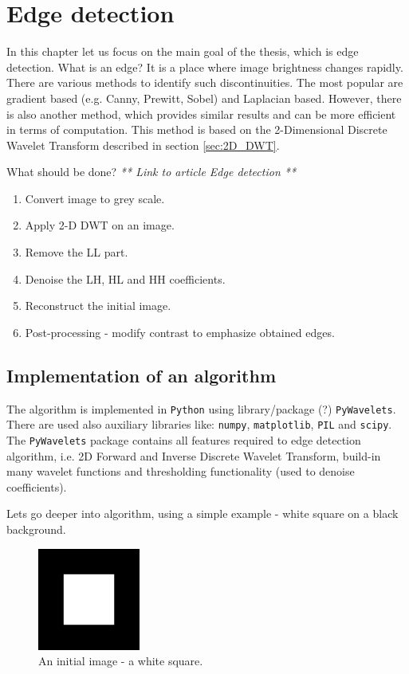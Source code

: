 \chapter{Edge detection}

In this chapter let us focus on the main goal of the thesis, which is edge detection. What is an edge? It is a place where image brightness changes rapidly. There are various methods to identify such discontinuities. The most popular are gradient based (e.g. Canny, Prewitt, Sobel) and Laplacian based. However, there is also another method, which provides similar results and can be more efficient in terms of computation. This method is based on the 2-Dimensional Discrete Wavelet Transform described in section \ref{sec:2D_DWT}. \newline

What should be done? \textit{** Link to article Edge detection **}
\begin{enumerate}
\item Convert image to grey scale.
\item Apply 2-D DWT on an image.
\item Remove the LL part.
\item Denoise the LH, HL and HH coefficients.
\item Reconstruct the initial image.
\item Post-processing - modify contrast to emphasize obtained edges.
\end{enumerate}

\section{Implementation of an algorithm}

The algorithm is implemented in \texttt{Python} using library/package (?) \texttt{PyWavelets}. There are used also auxiliary libraries like: \texttt{numpy}, \texttt{matplotlib}, \texttt{PIL} and \texttt{scipy}. The \texttt{PyWavelets} package contains all features required to edge detection algorithm, i.e. 2D Forward and Inverse Discrete Wavelet Transform, build-in many wavelet functions and thresholding functionality (used to denoise coefficients).

Lets go deeper into algorithm, using a simple example - white square on a black background.

\begin{figure}[h]
	\centering
	\includegraphics[width=0.3\textwidth]{graphs/square.png}
	\caption{An initial image - a white square.}
\end{figure}

